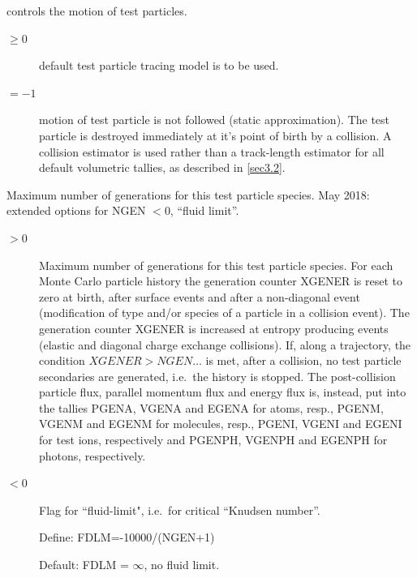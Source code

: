 \begin{description}
\begin{description}
        \end{description}
  \item[NFOL\$] controls the motion of test particles.
        \begin{description}
          \item[$\ge 0$] default test particle tracing model is to be used.
          \item[$= -1$] motion of test particle is not followed (static approximation).
                The test particle is destroyed immediately at it's point of birth by a
                collision.
                A collision estimator is used rather than a track-length estimator for all
                default volumetric tallies, as described in \cref{sec3.2}.
        \end{description}

  \item[NGEN\$] Maximum number of generations for this test particle species.
        May 2018: extended options for NGEN $<$0, ``fluid limit''.
        \begin{description}
          \item[$> 0$] Maximum number of generations for this test particle species.
                For each Monte Carlo particle history the generation counter XGENER is reset to
                zero at birth, after surface events and after a non-diagonal event
                (modification of type and/or species of a particle in a collision event).
                The generation counter XGENER is increased at entropy producing events (elastic
                and diagonal charge exchange collisions).
                If, along a trajectory, the condition $XGENER > NGEN\dots$ is met, after a
                collision, no test particle secondaries are generated, i.e.\ the history is
                stopped.
                The post-collision particle flux, parallel momentum flux and energy flux is,
                instead, put into the tallies PGENA, VGENA and EGENA for atoms, resp.,
                PGENM, VGENM and EGENM for molecules, resp.,  PGENI, VGENI and EGENI for test
                ions, respectively and PGENPH, VGENPH and EGENPH for photons, respectively.
          \item[$< 0$] Flag for  ``fluid-limit", i.e.\ for critical ``Knudsen number''.

                Define: FDLM=-10000/(NGEN+1) 

                Default: FDLM = $\infty$, no fluid limit.


\end{description}
\end{description}
